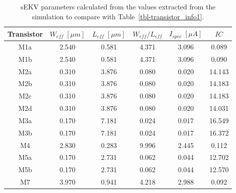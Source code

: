 \documentclass[
  a4paper,
  DIV=11,
  numbers=noendperiod]{scrreprt}
\begin{document}
\begin{longtable}[]{@{}cccccc@{}}

\caption{\label{tbl-ng_op4}sEKV parameters calculated from the values
extracted from the simulation to compare with
Table~\ref{tbl-transistor_info1}.}

\tabularnewline

\toprule\noalign{}
Transistor & \(W_{eff}\;[\mu m]\) & \(L_{eff}\;[\mu m]\) &
\(W_{eff}/L_{eff}\) & \(I_{spec}\;[\mu A]\) & \(IC\) \\
\midrule\noalign{}
\endhead
\bottomrule\noalign{}
\endlastfoot
M1a & 2.540 & 0.581 & 4.371 & 3.096 & 0.089 \\
M1b & 2.540 & 0.581 & 4.371 & 3.096 & 0.090 \\
M2a & 0.310 & 3.876 & 0.080 & 0.020 & 14.143 \\
M2b & 0.310 & 3.876 & 0.080 & 0.020 & 14.183 \\
M2c & 0.310 & 3.876 & 0.080 & 0.020 & 14.183 \\
M2d & 0.310 & 3.876 & 0.080 & 0.020 & 14.031 \\
M3a & 0.170 & 7.181 & 0.024 & 0.017 & 16.549 \\
M3b & 0.170 & 7.181 & 0.024 & 0.017 & 16.372 \\
M4 & 2.830 & 0.283 & 9.996 & 2.445 & 0.112 \\
M5a & 0.170 & 2.731 & 0.062 & 0.044 & 12.702 \\
M5b & 0.170 & 2.731 & 0.062 & 0.044 & 12.570 \\
M7 & 3.970 & 0.941 & 4.218 & 2.988 & 0.092 \\

\end{longtable}
\end{document}
